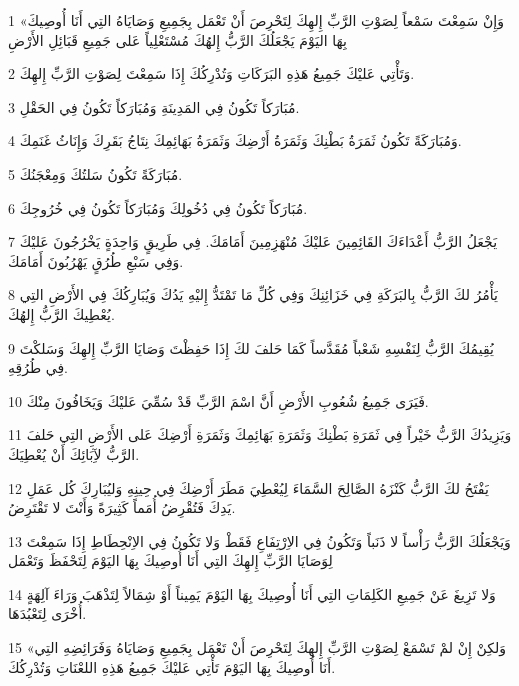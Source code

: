 \par 1 «وَإِنْ سَمِعْتَ سَمْعاً لِصَوْتِ الرَّبِّ إِلهِكَ لِتَحْرِصَ أَنْ تَعْمَل بِجَمِيعِ وَصَايَاهُ التِي أَنَا أُوصِيكَ بِهَا اليَوْمَ يَجْعَلُكَ الرَّبُّ إِلهُكَ مُسْتَعْلِياً عَلى جَمِيعِ قَبَائِلِ الأَرْضِ
\par 2 وَتَأْتِي عَليْكَ جَمِيعُ هَذِهِ البَرَكَاتِ وَتُدْرِكُكَ إِذَا سَمِعْتَ لِصَوْتِ الرَّبِّ إِلهِكَ.
\par 3 مُبَارَكاً تَكُونُ فِي المَدِينَةِ وَمُبَارَكاً تَكُونُ فِي الحَقْلِ.
\par 4 وَمُبَارَكَةً تَكُونُ ثَمَرَةُ بَطْنِكَ وَثَمَرَةُ أَرْضِكَ وَثَمَرَةُ بَهَائِمِكَ نِتَاجُ بَقَرِكَ وَإِنَاثُ غَنَمِكَ.
\par 5 مُبَارَكَةً تَكُونُ سَلتُكَ وَمِعْجَنُكَ.
\par 6 مُبَارَكاً تَكُونُ فِي دُخُولِكَ وَمُبَارَكاً تَكُونُ فِي خُرُوجِكَ.
\par 7 يَجْعَلُ الرَّبُّ أَعْدَاءَكَ القَائِمِينَ عَليْكَ مُنْهَزِمِينَ أَمَامَكَ. فِي طَرِيقٍ وَاحِدَةٍ يَخْرُجُونَ عَليْكَ وَفِي سَبْعِ طُرُقٍ يَهْرُبُونَ أَمَامَكَ.
\par 8 يَأْمُرُ لكَ الرَّبُّ بِالبَرَكَةِ فِي خَزَائِنِكَ وَفِي كُلِّ مَا تَمْتَدُّ إِليْهِ يَدُكَ وَيُبَارِكُكَ فِي الأَرْضِ التِي يُعْطِيكَ الرَّبُّ إِلهُكَ.
\par 9 يُقِيمُكَ الرَّبُّ لِنَفْسِهِ شَعْباً مُقَدَّساً كَمَا حَلفَ لكَ إِذَا حَفِظْتَ وَصَايَا الرَّبِّ إِلهِكَ وَسَلكْتَ فِي طُرُقِهِ.
\par 10 فَيَرَى جَمِيعُ شُعُوبِ الأَرْضِ أَنَّ اسْمَ الرَّبِّ قَدْ سُمِّيَ عَليْكَ وَيَخَافُونَ مِنْكَ.
\par 11 وَيَزِيدُكَ الرَّبُّ خَيْراً فِي ثَمَرَةِ بَطْنِكَ وَثَمَرَةِ بَهَائِمِكَ وَثَمَرَةِ أَرْضِكَ عَلى الأَرْضِ التِي حَلفَ الرَّبُّ لآِبَائِكَ أَنْ يُعْطِيَكَ.
\par 12 يَفْتَحُ لكَ الرَّبُّ كَنْزَهُ الصَّالِحَ السَّمَاءَ لِيُعْطِيَ مَطَرَ أَرْضِكَ فِي حِينِهِ وَليُبَارِكَ كُل عَمَلِ يَدِكَ فَتُقْرِضُ أُمَماً كَثِيرَةً وَأَنْتَ لا تَقْتَرِضُ.
\par 13 وَيَجْعَلُكَ الرَّبُّ رَأْساً لا ذَنَباً وَتَكُونُ فِي الاِرْتِفَاعِ فَقَطْ وَلا تَكُونُ فِي الاِنْحِطَاطِ إِذَا سَمِعْتَ لِوَصَايَا الرَّبِّ إِلهِكَ التِي أَنَا أُوصِيكَ بِهَا اليَوْمَ لِتَحْفَظَ وَتَعْمَل
\par 14 وَلا تَزِيغَ عَنْ جَمِيعِ الكَلِمَاتِ التِي أَنَا أُوصِيكَ بِهَا اليَوْمَ يَمِيناً أَوْ شِمَالاً لِتَذْهَبَ وَرَاءَ آلِهَةٍ أُخْرَى لِتَعْبُدَهَا.
\par 15 «وَلكِنْ إِنْ لمْ تَسْمَعْ لِصَوْتِ الرَّبِّ إِلهِكَ لِتَحْرِصَ أَنْ تَعْمَل بِجَمِيعِ وَصَايَاهُ وَفَرَائِضِهِ التِي أَنَا أُوصِيكَ بِهَا اليَوْمَ تَأْتِي عَليْكَ جَمِيعُ هَذِهِ اللعْنَاتِ وَتُدْرِكُكَ.
